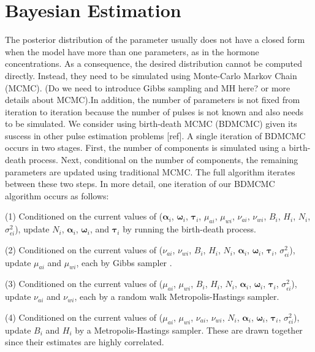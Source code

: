 \documentclass[11pt]{book}
\begin{document}
\section{Bayesian Estimation}

The posterior distribution of the parameter usually does not have a closed form  when the model have more than one parameters, as in the hormone concentrations. As a consequence, the desired distribution cannot be computed directly. Instead, they need to be simulated using Monte-Carlo Markov Chain (MCMC). (Do we need to introduce Gibbs sampling and MH here? or more details about MCMC).In addition, the number of parameters is not fixed from iteration to iteration because the number of pulses is not known and also needs to be simulated. We consider using birth-death MCMC (BDMCMC) given its suscess in other pulse estimation problems [ref]. A single iteration of BDMCMC occurs in two stages. First, the number of components is simulated using a birth-death process. Next, conditional on the number of components, the remaining parameters are updated using traditional MCMC. The full algorithm iterates between these two steps.
In more detail, one iteration of our BDMCMC algorithm occurs as follows:

\noindent (1) Conditioned on the current values of ($\boldsymbol{\alpha}_i$, $\boldsymbol{\omega}_i$, $\boldsymbol{\tau}_i$, $\mu_{ai}$, $\mu_{wi}$, $\nu_{ai}$, $\nu_{wi}$, $B_i$, $H_i$, $N_i$, $\sigma_{\epsilon i}^2$), update $N_i$, $\boldsymbol{\alpha}_i$, $\boldsymbol{\omega}_i$, and $\boldsymbol{\tau}_i$ by running the birth-death process.

\noindent (2) Conditioned on the current values of ($\nu_{ai}$, $\nu_{wi}$, $B_i$, $H_i$, $N_i$, $\boldsymbol{\alpha}_i$, $\boldsymbol{\omega}_i$, $\boldsymbol{\tau}_i$, $\sigma_{\epsilon i}^2$), update $\mu_{ai}$ and $\mu_{wi}$, each by Gibbs sampler \cite{Geman}.

\noindent (3) Conditioned on the current values of ($\mu_{ai}$, $\mu_{wi}$, $B_i$, $H_i$, $N_i$, $\boldsymbol{\alpha}_i$, $\boldsymbol{\omega}_i$, $\boldsymbol{\tau}_i$, $\sigma_{\epsilon i}^2$), update $\nu_{ai}$ and $\nu_{wi}$, each by a random walk Metropolis-Hastings sampler.

\noindent (4) Conditioned on the current values of ($\mu_{ai}$, $\mu_{wi}$, $\nu_{ai}$, $\nu_{wi}$, $N_i$, $\boldsymbol{\alpha}_i$, $\boldsymbol{\omega}_i$, $\boldsymbol{\tau}_i$, $\sigma_{\epsilon i}^2$), update $B_i$ and $H_i$ by a Metropolis-Hastings sampler. These are drawn together since their estimates are highly correlated.
\end{document}
